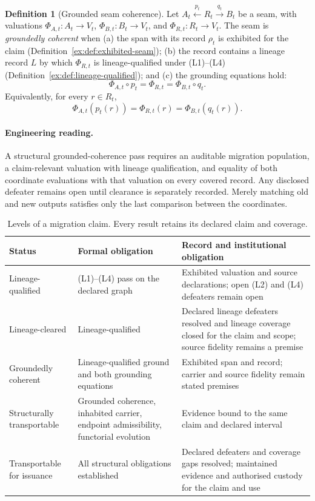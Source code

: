 \documentclass[11pt]{article}
\theoremstyle{definition}
\newtheorem{definition}{Definition}[section]
\begin{document}
\begin{definition}[Grounded seam coherence]\label{ex:def:grounded-seam}
Let $A_t \xleftarrow{p_t} R_t
\xrightarrow{q_t} B_t$ be a seam, with valuations
$\Phi_{A,t}:A_t\to V_t$, $\Phi_{B,t}:B_t\to V_t$, and
$\Phi_{R,t}:R_t\to V_t$. The seam is \emph{groundedly coherent} when (a) the span with its record $\rho_t$ is exhibited for the claim (Definition~\ref{ex:def:exhibited-seam}); (b) the record contains a lineage record $L$ by which $\Phi_{R,t}$ is lineage-qualified under (L1)--(L4) (Definition~\ref{ex:def:lineage-qualified}); and (c) the grounding equations hold:
\[
\Phi_{A,t}\circ p_t
=\Phi_{R,t}
=\Phi_{B,t}\circ q_t.
\]
Equivalently, for every $r\in R_t$,
\[
\Phi_{A,t}(p_t(r))
=\Phi_{R,t}(r)
=\Phi_{B,t}(q_t(r)).
\]
\end{definition}

\paragraph{Engineering reading.} A structural grounded-coherence pass requires an auditable migration population, a claim-relevant valuation with lineage qualification, and equality of both coordinate evaluations with that valuation on every covered record. Any disclosed defeater remains open until clearance is separately recorded. Merely matching old and new outputs satisfies only the last comparison between the coordinates.

\begin{table}[htbp]
\centering\small
\caption{Levels of a migration claim. Every result retains its declared claim and coverage.}
\label{ex:tab:claim-levels}
\begin{tabularx}{\textwidth}{@{}p{3.1cm}LL@{}}
\toprule
Status & Formal obligation & Record and institutional obligation \\
\midrule
Lineage-qualified & (L1)--(L4) pass on the declared graph & Exhibited valuation and source declarations; open (L2) and (L4) defeaters remain open \\
Lineage-cleared & Lineage-qualified & Declared lineage defeaters resolved and lineage coverage closed for the claim and scope; source fidelity remains a premise \\
Groundedly coherent & Lineage-qualified ground and both grounding equations & Exhibited span and record; carrier and source fidelity remain stated premises \\
Structurally transportable & Grounded coherence, inhabited carrier, endpoint admissibility, functorial evolution & Evidence bound to the same claim and declared interval \\
Transportable for issuance & All structural obligations established & Declared defeaters and coverage gaps resolved; maintained evidence and authorised custody for the claim and use \\
\bottomrule
\end{tabularx}
\end{table}
\end{document}

